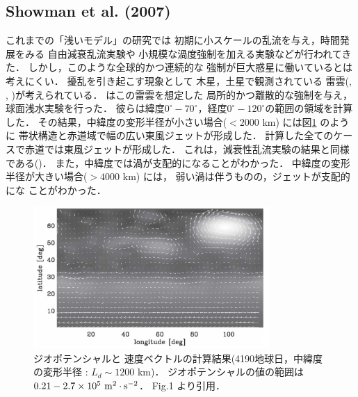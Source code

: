 \documentclass[a4j,12pt,openbib,oneside]{jreport}
\begin{document}
\subsection{Showman et al. (2007)}
\label{sec:intro21}
これまでの「浅いモデル」の研究では
初期に小スケールの乱流を与え，時間発展をみる
自由減衰乱流実験\citep{Yoden1993}や
小規模な渦度強制を加える実験\citep{Scott2007}などが行われてきた．
%
しかし，このような全球的かつ連続的な
強制が巨大惑星に働いているとは考えにくい．
%
擾乱を引き起こす現象として
木星，土星で観測されている
雷雲(\cite{Gierasch2000}, \cite{Porco2005}, \cite{Ingersoll2000})が考えられている．
%
\cite{Showman2007}はこの雷雲を想定した
局所的かつ離散的な強制を与え，球面浅水実験を行った．
彼らは緯度$0^\circ - 70^\circ$，経度$0^\circ - 120^\circ$の範囲の領域を計算した．
その結果，中緯度の変形半径が小さい場合($< 2000$ km) には図\ref{fig3} のように
帯状構造と赤道域で幅の広い東風ジェットが形成した．
計算した全てのケースで赤道では東風ジェットが形成した．
これは，減衰性乱流実験の結果と同様である()．
また，中緯度では渦が支配的になることがわかった．
%
中緯度の変形半径が大きい場合($> 4000$ km) には，
弱い渦は伴うものの，ジェットが支配的にな
ことがわかった．
%
%
\begin{figure}[H]
  \begin{center}
    \includegraphics[clip,width=9cm]{./fig/intro/fig3.png}
    \caption{
      \footnotesize{ジオポテンシャルと
速度ベクトルの計算結果(4190地球日，中緯度の変形半径 : $L_d \sim 1200$ km)．
ジオポテンシャルの値の範囲は$0.21 - 2.7 \times 10^5 \rm{~m^2 \cdot s^{-2}}$．
\cite{Showman2007} Fig.1 より引用．
      }
    }
    \label{fig3}
  \end{center}
\end{figure}
%
\end{document}
